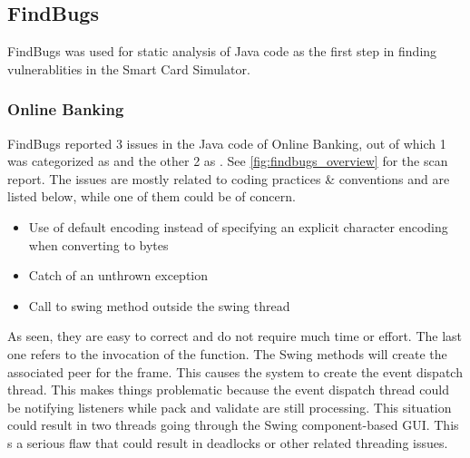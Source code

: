 \subsection{FindBugs}
FindBugs was used for static analysis of Java code as the first step in finding vulnerablities in the Smart Card Simulator.

\subsubsection{Online Banking}
FindBugs reported 3 issues in the Java code of Online Banking, out of which 1 was categorized as  and the other 2 as . See \ref{fig:findbugs_overview} for the scan report.
The issues are mostly related to coding practices \& conventions and are listed below, while one of them could be of concern.
\begin{itemize}
	\item Use of default encoding instead of specifying an explicit character encoding when converting to bytes
	\item Catch of an unthrown exception
	\item Call to swing method outside the swing thread
\end{itemize}
As seen, they are easy to correct and do not require much time or effort. The last one refers to the invocation of the  function. The Swing methods  will create the associated peer for the frame. This causes the system to create the event dispatch thread. This makes things problematic because the event dispatch thread could be notifying listeners while pack and validate are still processing. This situation could result in two threads going through the Swing component-based GUI. This s a serious flaw that could result in deadlocks or other related threading issues.

